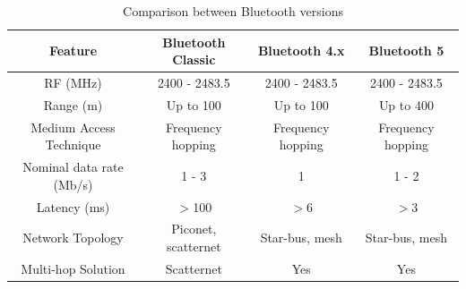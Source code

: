 \documentclass[journal, a4paper]{IEEEtran}
\begin{document}
\begin{table}[]
\centering
\caption{Comparison between Bluetooth versions}
\label{table:comparison}
\begin{tabular}{||c|c|c|c||}
\hline
Feature                  & Bluetooth Classic     & Bluetooth 4.x                                                                               & Bluetooth 5                                                                                                           \\
\hline\hline
RF (MHz)                 & 2400 - 2483.5         & 2400 - 2483.5                                                                               & 2400 - 2483.5                                                                                                         \\
\hline
Range (m)                & Up to 100             & Up to 100                                                                                   & Up to 400                                                                                                             \\
\hline
Medium Access Technique  & Frequency hopping     & Frequency hopping                                                                           & Frequency hopping                                                                                                     \\
\hline
Nominal data rate (Mb/s) & 1 - 3                 & 1                                                                                           & 1 - 2                                                                                                                 \\
\hline
Latency (ms)             & $>$100                 & $>$6                                                                                         & $>$3                                                                                                                   \\
\hline
Network Topology         & Piconet, scatternet    & Star-bus, mesh                                                                              & Star-bus, mesh                                                                                                        \\
\hline
Multi-hop Solution       & Scatternet            & Yes                                                                                         & Yes                                                                                                                   \\

\end{tabular}
\end{table}
\end{document}

